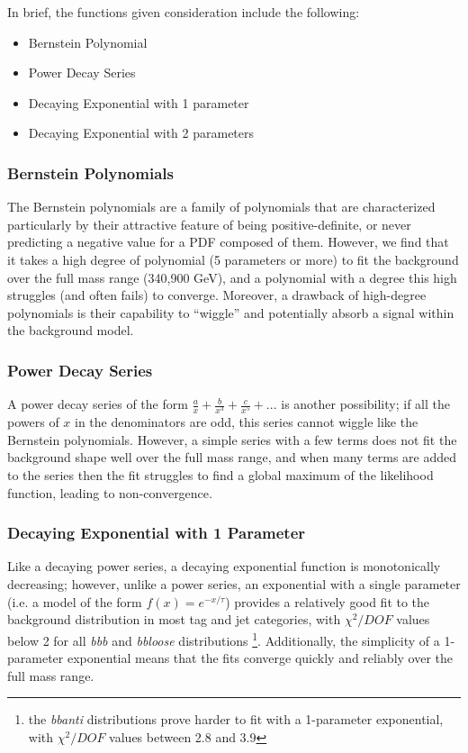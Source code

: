 In brief, the functions given consideration include the following:
\begin{itemize}
    \item Bernstein Polynomial
    \item Power Decay Series
    \item Decaying Exponential with 1 parameter
    \item Decaying Exponential with 2 parameters
\end{itemize}

\subsubsection{Bernstein Polynomials}
The Bernstein polynomials are a family of polynomials that are characterized
particularly by their attractive feature of being positive-definite, or never
predicting a negative value for a PDF composed of them.  However, we find
that it takes a high degree of polynomial (5 parameters or more) to fit the
background over the full mass range (340,900 GeV), and a polynomial with a 
degree this high struggles (and often fails) to converge.  Moreover, a
drawback of high-degree polynomials is their capability to ``wiggle'' and
potentially absorb a signal within the background model.

\subsubsection{Power Decay Series}
A power decay series of the form $\frac{a}{x} + \frac{b}{x^3} + \frac{c}{x^5} + ...$
is another possibility; if all the powers of $x$ in the denominators are
odd, this series cannot wiggle like the Bernstein polynomials.  However,
a simple series with a few terms does not fit the background shape well 
over the full mass range, and when many terms are added to the series then
the fit struggles to find a global maximum of the likelihood function, leading
to non-convergence.

\subsubsection{Decaying Exponential with 1 Parameter}
Like a decaying power series, a decaying exponential function is monotonically
decreasing; however, unlike a power series, an exponential with a single
parameter (i.e. a model of the form $f(x)=e^{-x/\tau}$) provides 
a relatively good fit to the background distribution in most tag and jet
categories, with $\chi^2/DOF$ values below 2 for all \textit{bbb} and \textit{bbloose}
distributions \footnote{the \textit{bbanti} distributions prove harder to
fit with a 1-parameter exponential, with $\chi^2/DOF$ values between 2.8 and 3.9}.
Additionally, the simplicity of a 1-parameter exponential means that the
fits converge quickly and reliably over the full mass range.

